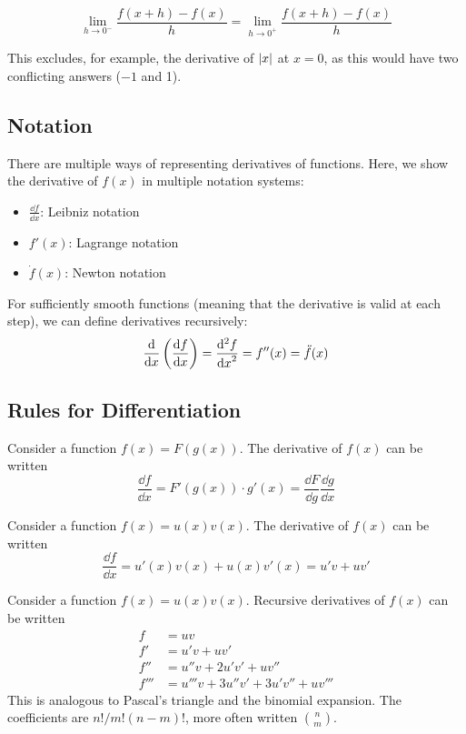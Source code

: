 \documentclass{article}
\begin{document}
\[ \lim_{h \to 0^-} \frac{f(x+h)-f(x)}{h} = \lim_{h \to 0^+} \frac{f(x+h)-f(x)}{h} \]

This excludes, for example, the derivative of $\abs{x}$ at $x=0$, as this would have two conflicting answers ($-1$ and 1).

\subsection{Notation}
There are multiple ways of representing derivatives of functions. Here, we show the derivative of $f(x)$ in multiple notation systems:
\begin{itemize}
    \item $\displaystyle \frac{\dd{f}}{\dd{x}}$: Leibniz notation
    \item $f'(x)$: Lagrange notation
    \item $\dot f (x)$: Newton notation
\end{itemize}

For sufficiently smooth functions (meaning that the derivative is valid at each step), we can define derivatives recursively:
\[
    \frac{\mathrm{d}}{\dd{x}}\left( \frac{\dd{f}}{\dd{x}} \right)
    = \frac{\mathrm{d}^2f}{\dd{x}^2}
    = f''(x) = \ddot f (x)
\]

\subsection{Rules for Differentiation}
\begin{definition}
    Consider a function $f(x) = F(g(x))$. The derivative of $f(x)$ can be written
    \begin{equation}
        \frac{\dd{f}}{\dd{x}} = F'(g(x)) \cdot g'(x) = \frac{\dd{F}}{\dd{g}} \frac{\dd{g}}{\dd{x}}
    \end{equation}
\end{definition}

\begin{definition}
    Consider a function $f(x) = u(x)v(x)$. The derivative of $f(x)$ can be written
    \begin{equation}
        \frac{\dd{f}}{\dd{x}} = u'(x)v(x) + u(x)v'(x) = u'v + uv'
    \end{equation}
\end{definition}

\begin{definition}
    Consider a function $f(x) = u(x)v(x)$. Recursive derivatives of $f(x)$ can be written
    \begin{align}
        f    & = uv                                        \\
        f'   & = u'v + uv' \nonumber                       \\
        f''  & = u''v + 2u'v' + uv'' \nonumber             \\
        f''' & = u'''v + 3u''v' + 3u'v'' + uv''' \nonumber
    \end{align}
    This is analogous to Pascal's triangle and the binomial expansion. The coefficients are $n!/m!(n-m)!$, more often written $n \choose m$.
\end{definition}
\end{document}
